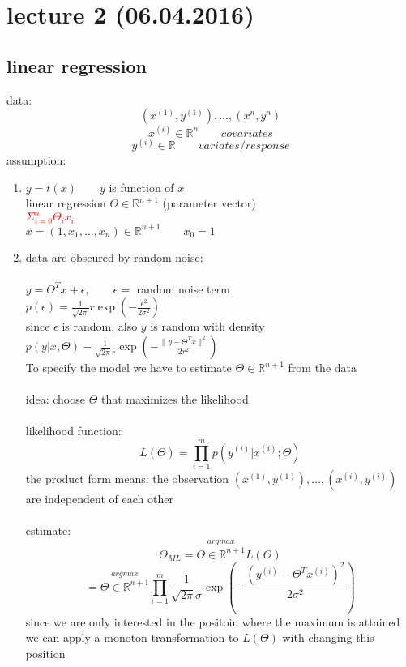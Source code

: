 \section*{lecture 2 (06.04.2016)}
\subsection*{linear regression}
data: \space \[(x^{(1)}, y^{(1)}), \dots , (x^{n}, y^{n})\]
\[x^{(i)} \in \mathbb{R}^n \quad\quad covariates\]
\[y^{(i)} \in \mathbb{R} \quad\quad variates/response \]
assumption:
\begin{enumerate}[(1)]
\item $y = t(x) \quad\quad y$ is function of $x$\\
linear regression \space\space {} \space $\Theta \in \mathbb{R}^{n+1}$ (parameter vector)\\
\textcolor{red}{\quad\quad\quad\quad\quad\quad\quad\quad\quad$\Sigma^n_{i = 0} \Theta_i x_i$}\\
$x= (1,x_1, \dots ,x_n) \in \mathbb{R}^{n+1} \quad \quad x_0 = 1$
\item data are obscured by random noise:\\\\
$y = \Theta^T x +\epsilon, \quad\quad \epsilon = $ random noise term\\
$p(\epsilon) = \frac{1}{\sqrt{2\pi}} r \exp (- \frac{\epsilon^2}{2 \sigma^2})$\\
since $\epsilon$ is random, also $y$ is random with density $p(y|x, \Theta) - \frac{1}{\sqrt{2\pi}r} \exp (- \frac{\lVert y- \Theta^T x\lVert^2}{2r^2})$\\
To specify the model we have to estimate $\Theta \in \mathbb{R}^{n+1}$ from the data\\\\
idea: choose $\Theta$ that maximizes the likelihood\\\\
likelihood function:
\[L(\Theta) = \prod^m_{i=1} p(y^{(i)}|x^{(i)};\Theta)\]
the product form means: the observation $(x^{(1)},y^{(1)}), \dots , (x^{(i)}, y^{(i)})$ are independent of each other\\\\
estimate:
\[ \Theta_{ML} = \stackrel{argmax}{\Theta \in \mathbb{R}^{n+1}} L(\Theta) \]
\[ = \stackrel{argmax}{\Theta \in \mathbb{R}^{n+1}} \prod^m_{i=1} \frac{1}{\sqrt{2 \pi} \sigma} \exp \left(- \frac{(y^{(i)} - \Theta^T x^{(i)})^2}{2 \sigma^2}\right)\]
since we are only interested in the positoin where the maximum is attained we can apply a monoton transformation to $L(\Theta)$ with changing this position\\\\

\end{enumerate}
